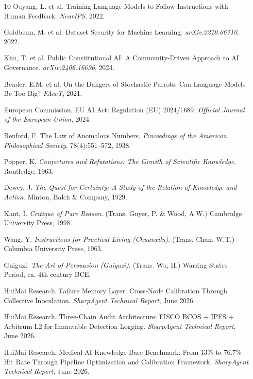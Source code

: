 \documentclass[11pt]{article}
\begin{document}
\begin{thebibliography}{10}
Ouyang, L. et al. Training Language Models to Follow Instructions with Human Feedback. \textit{NeurIPS}, 2022.

Goldblum, M. et al. Dataset Security for Machine Learning. \textit{arXiv:2210.06710}, 2022.

Kim, T. et al. Public Constitutional AI: A Community-Driven Approach to AI Governance. \textit{arXiv:2406.16696}, 2024.

Bender, E.M. et al. On the Dangers of Stochastic Parrots: Can Language Models Be Too Big? \textit{FAccT}, 2021.

European Commission. EU AI Act: Regulation (EU) 2024/1689. \textit{Official Journal of the European Union}, 2024.

Benford, F. The Law of Anomalous Numbers. \textit{Proceedings of the American Philosophical Society}, 78(4):551--572, 1938.

Popper, K. \textit{Conjectures and Refutations: The Growth of Scientific Knowledge}. Routledge, 1963.

Dewey, J. \textit{The Quest for Certainty: A Study of the Relation of Knowledge and Action}. Minton, Balch \& Company, 1929.

Kant, I. \textit{Critique of Pure Reason}. (Trans. Guyer, P. \& Wood, A.W.) Cambridge University Press, 1998.

Wang, Y. \textit{Instructions for Practical Living (Chuanxilu)}. (Trans. Chan, W.T.) Columbia University Press, 1963.

Guiguzi. \textit{The Art of Persuasion (Guiguzi)}. (Trans. Wu, H.) Warring States Period, ca. 4th century BCE.

HuiMai Research. Failure Memory Layer: Cross-Node Calibration Through Collective Inoculation.
\textit{SharpAgent Technical Report}, June 2026.

HuiMai Research. Three-Chain Audit Architecture: FISCO BCOS + IPFS + Arbitrum L2 for
Immutable Detection Logging. \textit{SharpAgent Technical Report}, June 2026.

HuiMai Research. Medical AI Knowledge Base Benchmark: From 13\% to 76.7\% Hit Rate
Through Pipeline Optimization and Calibration Framework. \textit{SharpAgent Technical Report}, June 2026.


\end{thebibliography}
\end{document}
